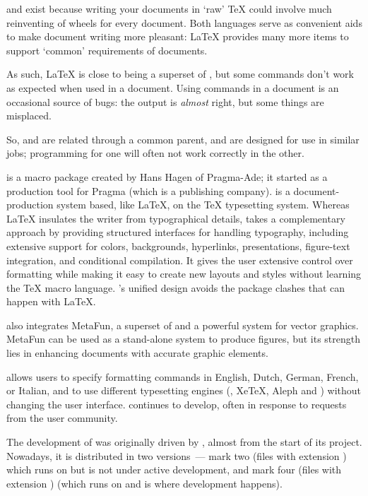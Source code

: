 \plaintex{} and \latex{} exist because writing your documents in `raw'
\TeX{} could involve much reinventing of wheels for every document.
Both languages serve as convenient aids to make document writing more
pleasant: \LaTeX{} provides many more items to support `common'
requirements of documents.

As such, \LaTeX{} is close to being a superset of \plaintex{}, but
some \plaintex{} commands don't work as expected when used in a
\latex{} document.  Using \plaintex{} commands in a \latex{} document
is an occasional source of bugs: the output is \emph{almost} right,
but some things are misplaced.

So, \plaintex{} and \latex{} are related through a common parent, and
are designed for use in similar jobs; programming for one will often
not work correctly in the other.


\href{http://www.pragma-ade.com/}{\context{}} is a macro package
created by Hans Hagen of Pragma-Ade; it started as a production tool
for Pragma (which is a publishing company).  \CONTeXT{} is a
document-production system based, like \LaTeX{}, on the \TeX{}
typesetting system.  Whereas \LaTeX{} insulates the writer from
typographical details, \context{} takes a complementary approach by
providing structured interfaces for handling typography, including
extensive support for colors, backgrounds, hyperlinks, presentations,
figure-text integration, and conditional compilation.  It gives the
user extensive control over formatting while making it easy to create
new layouts and styles without learning the \TeX{} macro
language. \CONTeXT{}'s unified design avoids the package clashes that
can happen with \LaTeX{}.

\context{} also integrates MetaFun, a superset of \MP{} and a powerful
system for vector graphics.  MetaFun can be used as a stand-alone
system to produce figures, but its strength lies in enhancing
\context{} documents with accurate graphic elements.

\context{} allows users to specify formatting commands in English,
Dutch, German, French, or Italian, and to use different typesetting
engines (\PDFTeX{}, Xe\TeX{}, Aleph and \LuaTeX{}) without
changing the user interface. \context{} continues to develop, often in
response to requests from the user community.

The development of  was originally driven
by \context{}, almost from the start of its project.  Nowadays,
\context{} it is distributed in two versions~--- mark two (files with
extension ) which runs on \pdftex{} but is not under
active development, and mark four (files with extension
) (which runs on \luatex{} and is where development
happens).


